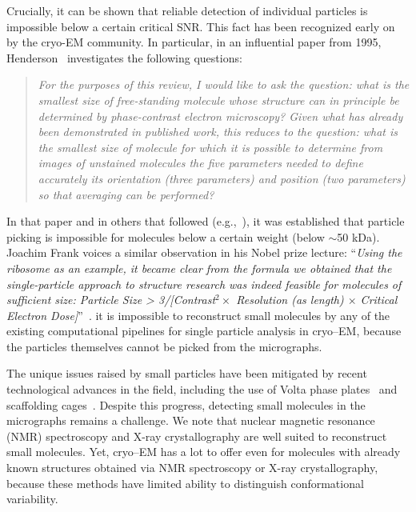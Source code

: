 \documentclass[9pt,twocolumn,twoside,lineno]{pnas-new}
\begin{document}
Crucially, it can be shown that reliable detection of individual particles is impossible below a certain critical SNR. This fact has been recognized early on by the cryo-EM community. In particular, in an influential paper from 1995, Henderson~\cite{henderson1995limitations} investigates the following questions:
\begin{quote}
	\emph{For the purposes of this review, I would like to ask the question: what is the smallest size of free-standing molecule whose structure can in principle be determined by phase-contrast electron microscopy? Given what has already been demonstrated in published work, this reduces to the question: what is the smallest size of molecule for which it is possible to determine from images of unstained molecules the five parameters needed to define accurately its orientation (three parameters) and position (two parameters) so that averaging can be performed?}
\end{quote}
In that paper and in others that followed (e.g.,~\cite{glaeser1999electron}), it was established that particle picking is impossible for molecules below a certain weight (below $\sim$50 kDa). 
Joachim Frank voices a similar observation in his Nobel prize lecture: ``\emph{Using the ribosome as an example, it became clear from the formula we obtained that the single-particle approach to structure research was indeed feasible for molecules of sufficient size: Particle Size > 3/[Contrast$^2\times $  Resolution (as length) $\times$ Critical Electron Dose]}''~\cite{frank2018single}. 
 it is impossible to reconstruct small molecules by any of the existing computational pipelines for single particle analysis in cryo--EM, because the particles themselves cannot be picked from the micrographs.

The unique issues raised by small particles have been mitigated by recent technological advances in the field, including the use of Volta phase plates~\cite{khoshouei2017cryo,liang2017phase} and scaffolding cages~\cite{liu2018nearatomic}.
Despite this progress, detecting small molecules in the micrographs remains a challenge.
We note that nuclear magnetic resonance (NMR) spectroscopy and X-ray crystallography are well suited to reconstruct small molecules. Yet, cryo--EM has a lot to offer even for molecules with already known structures obtained via NMR spectroscopy or X-ray crystallography, because these methods have limited ability to distinguish conformational variability. 
\end{document}
